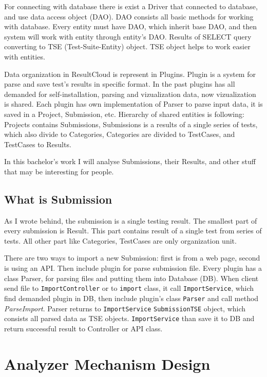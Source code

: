 For connecting with database there is exist a Driver that connected to database, and use data access object (DAO). DAO consists all basic methods for working with database. Every entity must have DAO, which inherit base DAO, and then system will work with entity through entity's DAO. Results of SELECT query converting to TSE (Test-Suite-Entity) object. TSE object helps to work easier with entities.

Data organization in ResultCloud is represent in Plugins. Plugin is a system for parse and save test's results in specific format. In the past plugins has all demanded for self-installation, parsing and vizualization data, now vizualization is shared. 
Each plugin has own implementation of Parser to parse input data, it is saved in a Project, Submission, etc. Hierarchy of shared entities is following: Projects  contains Submissions, Submissions is a results of a single series of tests, which also divide to Categories, Categories are divided to TestCases, and TestCases to Results.

In this bachelor's work I will analyse Submissions, their Results, and other stuff that may be interesting for people.

\section{What is Submission}

As I wrote behind, the submission is a single testing result. The smallest part of every submission is Result. This part contains result of a single test from series of tests. All other part like Categories, TestCases are only organization unit. 

There are two ways to import a new Submission: first is from a web page, second is using an API. Then include plugin for parse submission file. Every plugin has a class Parser, for parsing files and putting them into Database (DB). When client send file to \texttt{ImportController} or to \texttt{import} class, it call \texttt{ImportService}, which find demanded plugin in DB, then include plugin's class \texttt{Parser} and call method \emph{ParseImport}. Parser returns to \texttt{ImportService} \texttt{SubmissionTSE} object, which consists all parsed data as TSE objects. \texttt{ImportService} than save it to DB and return successful result to Controller or API class.

\chapter{Analyzer Mechanism Design}

